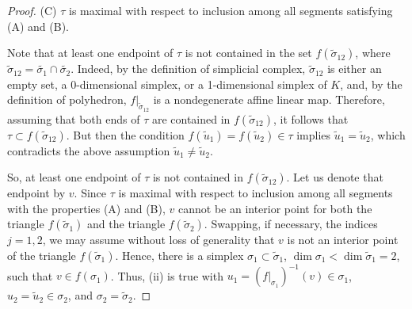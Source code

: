 \documentclass[10pt,a4paper]{amsart}
\begin{document}
\begin{proof}
(C) 
$\tau$ 
is maximal with respect to inclusion among all segments satisfying (A) and (B).

Note that at least one endpoint of  
$\tau$ 
is not contained in the set
$f(\widetilde{\sigma}_{12})$,
where 
$\widetilde{\sigma}_{12}=\widetilde{\sigma_1}\cap\widetilde{\sigma_2}$.
Indeed, by the definition of simplicial complex, 
$\widetilde{\sigma}_{12}$ 
is either an empty set, a 0-dimensional simplex, or a 1-dimensional simplex of 
$K$, 
and, 
by the definition of polyhedron, 
$f\vert_{\widetilde{\sigma}_{12}}$
is a nondegenerate affine linear map.
Therefore, assuming that both ends of  
$\tau$ 
are contained in  
$f(\widetilde{\sigma}_{12})$, 
it follows that  
$\tau\subset f(\widetilde{\sigma}_{12})$.
But then the condition 
$f(\widetilde{u}_1)=f(\widetilde{u}_2)\in \tau$ 
implies 
$\widetilde{u}_1=\widetilde{u}_2$, 
which contradicts the above assumption 
$\widetilde{u}_1\neq\widetilde{u}_2$.

So, at least one endpoint of  
$\tau$ 
is not contained in 
$f(\widetilde{\sigma}_{12})$.
Let us denote that endpoint by
$v$.
Since
$\tau$
is maximal with respect to inclusion among all segments with the properties (A) and (B),
$v$ 
cannot be an interior point for both the triangle 
$f(\widetilde{\sigma}_1)$ 
and the triangle 
$f(\widetilde{\sigma}_2)$.
Swapping, if necessary, the indices 
$j=1,2$, 
we may assume without loss of generality that 
$v$
is not an interior point of the triangle 
$f(\widetilde{\sigma}_1)$.
Hence, there is a simplex 
${\sigma_1}\subset\widetilde{\sigma}_1$,
$\dim {\sigma}_1 <\dim \widetilde{\sigma}_1=2$,
such that
$v\in f(\sigma_1)$.
Thus, (ii) is true with
$u_1=(f\vert_{\sigma_1})^{-1}(v)\in\sigma_1$,
$u_2=\widetilde{u}_2\in\sigma_2$,
and 
$\sigma_2=\widetilde{\sigma}_2$.
\end{proof}
\end{document}
